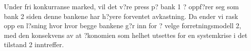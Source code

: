 \documentclass[a4paper,notitlepage]{article}
\begin{document}
Under fri konkurranse marked, vil det v?re press p? bank 1 ? oppf?rer seg som bank 2 siden denne bankene har h?yere forventet avkastning. Da ender vi rask opp en l?sning hvor hvor begge bankene g?r inn for ? velge forretningsmodell 2, med den konsekvens av at ?konomien som helhet utsettes for en systemkrise  i det tilstand 2 inntreffer.
\end{document}
